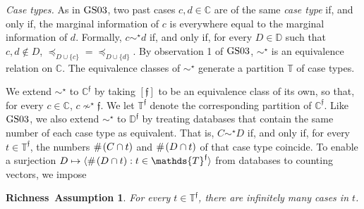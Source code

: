 \documentclass[ecta,nameyear,draft]{econsocart}
\newcommand{\countof}{\mathbin{\#}\hskip1pt}
\newcommand{\novel}{\mathfrak f}
\newcommand{\preceqb}{\mathbin{\preceq}}
\newcommand{\mbbd}{{\mathds D}}
\newcommand{\mbbdp}{{\mathds D^{\novel}}}
\newcommand{\mbbc}{{\mathds C}}
\newcommand{\mbbcp}{{\mathds C^{\novel}}}
\newcommand{\mbbt}{{\mathds {T}}}
\newcommand{\mbbtp}{{\mathds{T}^\novel}}
\newcommand{\gsii}{$\textup{GS03}$}
\theoremstyle{plain}
\newtheorem*{assumption*}{Richness~Assumption}
\theoremstyle{remark}
\begin{document}



\emph{Case types.} As in \gsii, two past cases $c , d \in \mbbc$
are of the same \emph{case type} if, and only if, the marginal information of
$c$ is everywhere equal to the marginal information of $d$. Formally, $c \sim
^{\star} d$ if, and only if, for every $D \in \mbbd$ such that $c , d \notin
D$, $\preceqb _ {D \cup \{c \}} = \preceqb _ {D \cup \{d \}}$.  By
observation 1 of \gsii, $\sim^{\star}$ is an equivalence relation on
$\mbbc$. The equivalence classes of $\sim^\star$ generate a partition $\mbbt$
of case types.

We extend $\sim^{\star}$ to $\mbbcp$ by taking $[ \novel ]$ to be an
equivalence class of its own, so that, for every $c \in \mbbc$, $c \nsim^{
\star} \novel$.  We let $\mbbtp$ denote the corresponding partition of
$\mbbcp$.  Like \gsii, we also extend $\sim^{\star}$ to $\mbbdp$ by treating
databases that contain the same number of each case type as equivalent. That
is, $C \sim^{\star} D$ if, and only if, for every $t \in \mbbtp$, the numbers
$\countof (C \cap t)$ and $\countof (D \cap t)$ of that case type coincide. To
enable a surjection $D \mapsto \langle\countof (D \cap t): t \in \mbbtp
\rangle$ from databases to counting vectors, we impose



\begin{assumption*}
  For every  $t \in \mbbtp$, there are infinitely many cases in $t$.
\end{assumption*}

\end{document}
